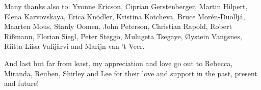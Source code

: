 Many thanks also to:
Yvonne Ericson, 
Ciprian Gerstenberger, 
Martin Hilpert, 
Elena Karvovskaya, 
Erica Knödler, 
Kristina Kotcheva, 
Bruce Morén-Duoll\-já, 
Maar\-ten Mous, 
Stanly Oomen, 
John Peterson, 
Christian Rapold, 
Robert Rißmann, 
Florian Siegl, 
Peter Steggo, 
Mulugeta Tsegaye, 
Øystein Vangsnes, 
Riitta-Liisa Valijärvi and 
Marijn van ’t Veer. 


And last but far from least, my appreciation and love go out to Rebecca, Miranda, Reuben, Shirley and Lee for their love and support in the past, present and future!

\vspace{24pt}
\hfill {}










%